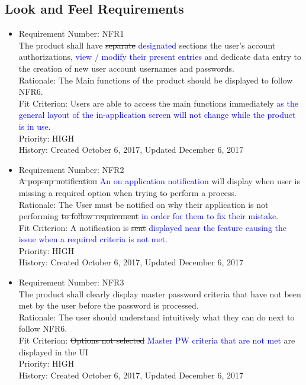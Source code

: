 \documentclass[12pt, titlepage]{article}
\begin{document}
\subsection{Look and Feel Requirements}
\begin{itemize}
	\item Requirement Number: NFR1\\
The product shall have \sout{separate} \textcolor{blue}{designated} sections  the user’s account authorizations, \textcolor{blue}{view / modify their present entries} and dedicate data entry to the creation of new user account usernames and passwords.\\
Rationale: The Main functions of the product should be displayed to follow NFR6.\\
Fit Criterion: Users are able to access the main functions immediately \textcolor{blue}{as the general layout of the in-application screen will not change while the product is in use}.\\
Priority: HIGH\\
History: Created October 6, 2017, Updated December 6, 2017
	\item Requirement Number: NFR2\\
\sout{A pop-up notification} \textcolor{blue}{An on application notification} will display when user is missing a required option when trying to perform a process.\\
Rationale: The User must be notified on why their application is not performing \sout{to follow requirement} \textcolor{blue}{in order for them to fix their mistake}. \\
Fit Criterion: A notification is \sout{sent} \textcolor{blue}{displayed near the feature causing the issue when a required criteria is not met.}\\
Priority: HIGH\\
History: Created October 6, 2017, Updated December 6, 2017

	\item Requirement Number: NFR3\\
The product shall clearly display master password criteria that have not been met by the user before the password is processed.\\
Rationale: The user should understand intuitively what they can do next to follow NFR6.\\
Fit Criterion: \sout{Options not selected} \textcolor{blue}{Master PW criteria that are not met} are displayed in the UI \\
Priority: HIGH\\
History: Created October 6, 2017, Updated December 6, 2017


\end{itemize}
\end{document}
